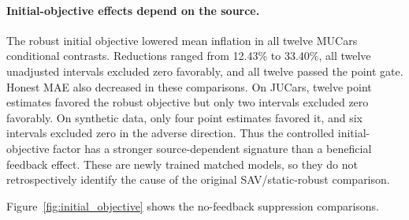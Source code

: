 \documentclass[11pt]{article}
\begin{document}
\paragraph{Initial-objective effects depend on the source.}
The robust initial objective lowered mean inflation in all twelve MUCars
conditional contrasts. Reductions ranged from 12.43\% to 33.40\%, all twelve
unadjusted intervals excluded zero favorably, and all twelve passed the point
gate. Honest MAE also decreased in these comparisons. On JUCars, twelve point
estimates favored the robust objective but only two intervals excluded zero
favorably. On synthetic data, only four point estimates favored it, and six
intervals excluded zero in the adverse direction. Thus the controlled
initial-objective factor has a stronger source-dependent signature than a
beneficial feedback effect. These are newly trained matched models, so they
do not retrospectively identify the cause of the original SAV/static-robust
comparison.

Figure~\ref{fig:initial_objective} shows the no-feedback suppression comparisons.
\end{document}
